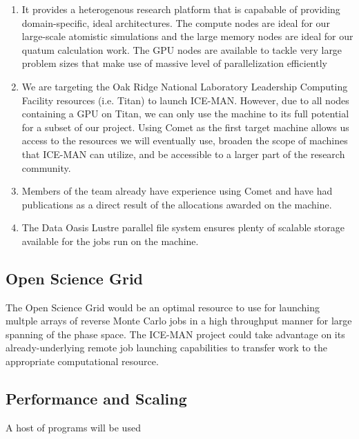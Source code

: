 \documentclass{proposalnsf}
\begin{document}
\begin{enumerate}
\item It provides a heterogenous research platform that is capabable of providing domain-specific, ideal architectures. The compute nodes are ideal for our large-scale atomistic simulations and the large memory nodes are ideal for our quatum calculation work. The GPU nodes are available to tackle very large problem sizes that make use of massive level of parallelization efficiently

\item We are targeting the Oak Ridge National Laboratory Leadership Computing Facility resources (i.e. Titan) to launch ICE-MAN. However, due to all nodes containing a GPU on Titan, we can only use the machine to its full potential for a subset of our project. Using Comet as the first target machine allows us access to the resources we will eventually use, broaden the scope of machines that ICE-MAN can utilize, and be accessible to a larger part of the research community.

\item Members of the team already have experience using Comet and have had publications as a direct result of the allocations awarded on the machine.

\item The Data Oasis Lustre parallel file system ensures plenty of scalable storage available for the jobs run on the machine.

\end{enumerate}

\subsection*{Open Science Grid}
The Open Science Grid would be an optimal resource to use for launching multple arrays of reverse Monte Carlo jobs in a high throughput manner for large spanning of the phase space. The ICE-MAN project could take advantage on its already-underlying remote job launching capabilities to transfer work to the appropriate computational resource.

\subsection*{Performance and Scaling}

A host of programs will be used 
\end{document}
